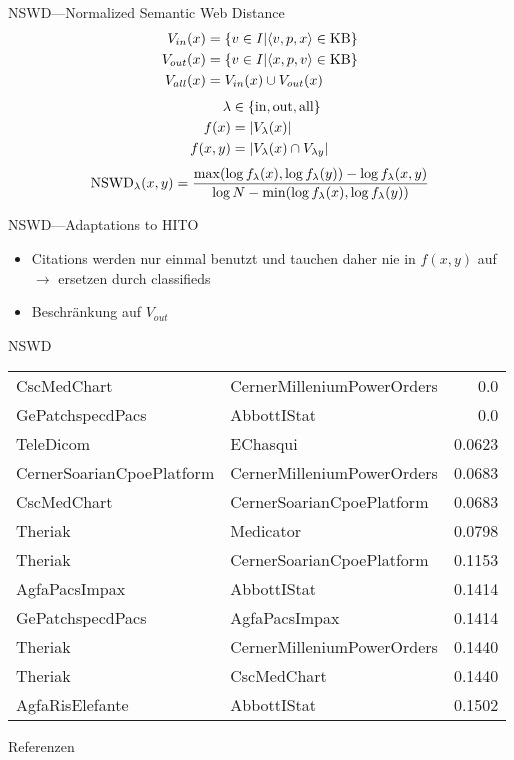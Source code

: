 \documentclass[aspectratio=1610]{beamer}
\newcommand{\f}[1]{\ensuremath{f(#1)}}
\newcommand{\fl}[1]{\ensuremath{f_{\lambda}(#1)}}
\begin{document}
\begin{frame}{NSWD---Normalized Semantic Web Distance~\cite{normalizedsemanticwebdistance}}
\begin{align*}
V_{in}(x)	&= \{v \in I| \langle v,p,x \rangle \in \textnormal{KB}\}\\
V_{out}(x)	&= \{v \in I| \langle x,p,v \rangle \in \textnormal{KB}\}\\
V_{all}(x)	&= V_{in}(x) \cup V_{out}(x)
\end{align*}
\begin{align*}
\lambda		&\in \{\textnormal{in}, \textnormal{out}, \textnormal{all}\}\\
\f{x}		&= |V_{\lambda}(x)|\\
\f{x,y}	&= |V_{\lambda}(x) \cap V_{\lambda{y}}|
\end{align*}
\[
\textnormal{NSWD}_{\lambda}(x,y) = \frac{\max(\log \fl{x}, \log \fl{y})- \log \fl{x,y}}{\log N - \min(\log \fl{x}, \log \fl{y})}
\]
\end{frame}

\begin{frame}{NSWD---Adaptations to HITO}
\begin{itemize}
\item Citations werden nur einmal benutzt und tauchen daher nie in $\f{x,y}$ auf $\rightarrow$ ersetzen durch classifieds
\item Beschränkung auf $V_{out}$
\end{itemize}
\end{frame}

\begin{frame}{NSWD}
\begin{tabular}{llr}
CscMedChart					&CernerMilleniumPowerOrders	&0.0\\
GePatchspecdPacs					&AbbottIStat	&0.0\\
TeleDicom					&EChasqui	&0.0623\\
CernerSoarianCpoePlatform					&CernerMilleniumPowerOrders	&0.0683\\
CscMedChart					&CernerSoarianCpoePlatform	&0.0683\\
Theriak					&Medicator	&0.0798\\
Theriak					&CernerSoarianCpoePlatform	&0.1153\\
AgfaPacsImpax					&AbbottIStat	&0.1414\\
GePatchspecdPacs					&AgfaPacsImpax	&0.1414\\
Theriak					&CernerMilleniumPowerOrders	&0.1440\\
Theriak					&CscMedChart	&0.1440\\
AgfaRisElefante					&AbbottIStat	&0.1502\\
\end{tabular}
\end{frame}

\begin{frame}{Referenzen}


\end{frame}
\end{document}
